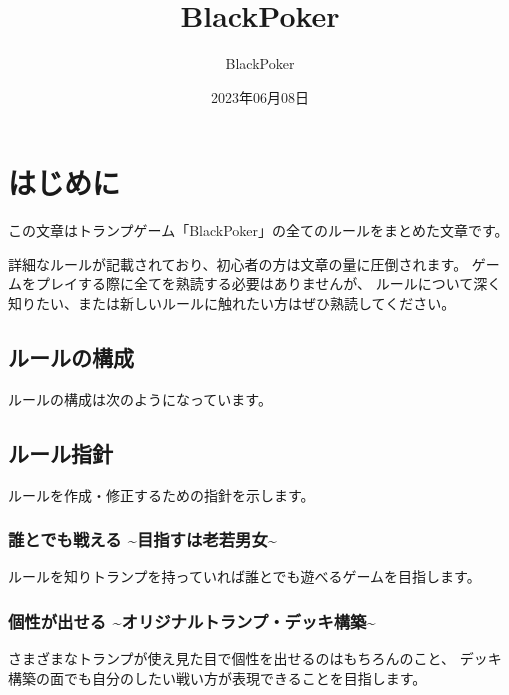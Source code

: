 \documentclass[letterpaper,10pt,dvipdfmx]{sphinxmanual}
\title{BlackPoker}
\date{2023年06月08日}
\author{BlackPoker}
\begin{document}
\pagestyle{empty}
\sphinxmaketitle
\pagestyle{plain}
\sphinxtableofcontents
\pagestyle{normal}
\label{\detokenize{index::doc}}
\ignorespaces 


\sphinxstepscope


\chapter{はじめに}
\label{\detokenize{init/init:id1}}\label{\detokenize{init/init::doc}}
\sphinxAtStartPar
この文章はトランプゲーム「BlackPoker」の全てのルールをまとめた文章です。

\sphinxAtStartPar
詳細なルールが記載されており、初心者の方は文章の量に圧倒されます。
ゲームをプレイする際に全てを熟読する必要はありませんが、
ルールについて深く知りたい、または新しいルールに触れたい方はぜひ熟読してください。


\section{ルールの構成}
\label{\detokenize{init/init:id2}}
\sphinxAtStartPar
ルールの構成は次のようになっています。

\noindent{}


\section{ルール指針}
\label{\detokenize{init/init:id3}}
\sphinxAtStartPar
ルールを作成・修正するための指針を示します。


\subsection{誰とでも戦える \textasciitilde{}目指すは老若男女\textasciitilde{}}
\label{\detokenize{init/init:id4}}
\sphinxAtStartPar
ルールを知りトランプを持っていれば誰とでも遊べるゲームを目指します。


\subsection{個性が出せる \textasciitilde{}オリジナルトランプ・デッキ構築\textasciitilde{}}
\label{\detokenize{init/init:id5}}
\sphinxAtStartPar
さまざまなトランプが使え見た目で個性を出せるのはもちろんのこと、
デッキ構築の面でも自分のしたい戦い方が表現できることを目指します。
\end{document}
